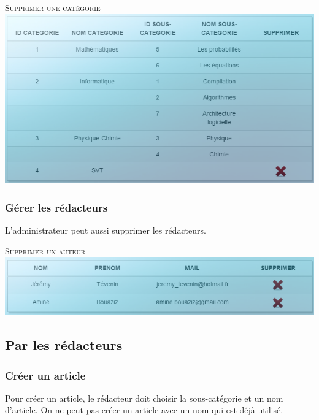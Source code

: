 \documentclass[hidelinks, 12pt,a4paper]{article}
\begin{document}
\begin{center}
\textsc{Supprimer une catégorie}\\
\includegraphics[width=16cm]{images/suppcat.png}\\
\end{center}

\subsubsection{Gérer les rédacteurs}
L'administrateur peut aussi supprimer les rédacteurs.

\begin{center}
\textsc{Supprimer un auteur}\\
\includegraphics[width=16cm]{images/suppaut.png}\\
\end{center}

\newpage
\subsection{Par les rédacteurs}
\subsubsection{Créer un article}
Pour créer un article, le rédacteur doit choisir la sous-catégorie et un nom d'article. On ne peut pas créer un article avec un nom qui est déjà utilisé.
\end{document}
